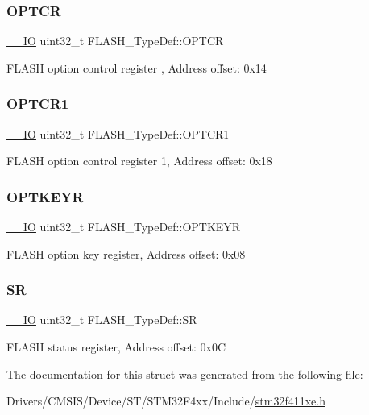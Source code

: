 \subsubsection{\texorpdfstring{O\+P\+T\+CR}{OPTCR}}
{\footnotesize\ttfamily \hyperlink{core__sc300_8h_aec43007d9998a0a0e01faede4133d6be}{\+\_\+\+\_\+\+IO} uint32\+\_\+t F\+L\+A\+S\+H\+\_\+\+Type\+Def\+::\+O\+P\+T\+CR}

F\+L\+A\+SH option control register , Address offset\+: 0x14 \mbox{\label{struct_f_l_a_s_h___type_def_a180354afdf5ff27d04befd794c46156d}} 
\subsubsection{\texorpdfstring{O\+P\+T\+C\+R1}{OPTCR1}}
{\footnotesize\ttfamily \hyperlink{core__sc300_8h_aec43007d9998a0a0e01faede4133d6be}{\+\_\+\+\_\+\+IO} uint32\+\_\+t F\+L\+A\+S\+H\+\_\+\+Type\+Def\+::\+O\+P\+T\+C\+R1}

F\+L\+A\+SH option control register 1, Address offset\+: 0x18 \mbox{\label{struct_f_l_a_s_h___type_def_a793cd13a4636c9785fdb99316f7fd7ab}} 
\subsubsection{\texorpdfstring{O\+P\+T\+K\+E\+YR}{OPTKEYR}}
{\footnotesize\ttfamily \hyperlink{core__sc300_8h_aec43007d9998a0a0e01faede4133d6be}{\+\_\+\+\_\+\+IO} uint32\+\_\+t F\+L\+A\+S\+H\+\_\+\+Type\+Def\+::\+O\+P\+T\+K\+E\+YR}

F\+L\+A\+SH option key register, Address offset\+: 0x08 \mbox{\label{struct_f_l_a_s_h___type_def_a52c4943c64904227a559bf6f14ce4de6}} 
\subsubsection{\texorpdfstring{SR}{SR}}
{\footnotesize\ttfamily \hyperlink{core__sc300_8h_aec43007d9998a0a0e01faede4133d6be}{\+\_\+\+\_\+\+IO} uint32\+\_\+t F\+L\+A\+S\+H\+\_\+\+Type\+Def\+::\+SR}

F\+L\+A\+SH status register, Address offset\+: 0x0C 

The documentation for this struct was generated from the following file\+:\begin{DoxyCompactItemize}
\item 
Drivers/\+C\+M\+S\+I\+S/\+Device/\+S\+T/\+S\+T\+M32\+F4xx/\+Include/\hyperlink{stm32f411xe_8h}{stm32f411xe.\+h}\end{DoxyCompactItemize}
